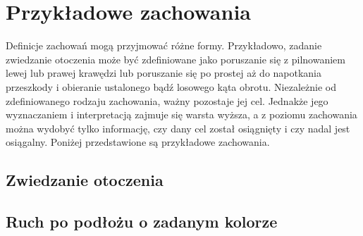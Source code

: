
\section{Przykładowe zachowania}

Definicje zachowań mogą przyjmować różne formy. Przykładowo, zadanie zwiedzanie otoczenia może być zdefiniowane jako poruszanie się z pilnowaniem lewej lub prawej krawędzi lub poruszanie się po prostej aż do napotkania przeszkody i obieranie ustalonego bądź losowego kąta obrotu. Niezależnie od zdefiniowanego rodzaju zachowania, ważny pozostaje jej cel. Jednakże jego wyznaczaniem i interpretacją zajmuje się warsta wyższa, a z poziomu zachowania można wydobyć tylko informację, czy dany cel został osiągnięty i czy nadal jest osiągalny. Poniżej przedstawione są przykładowe zachowania.

\subsection{Zwiedzanie otoczenia}

\subsection{Ruch po podłożu o zadanym kolorze}
